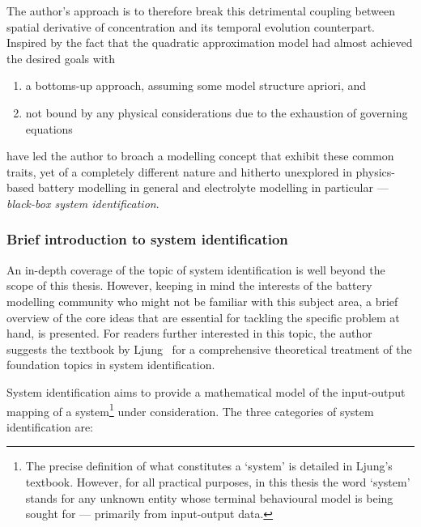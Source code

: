The author's  approach is to  therefore break this detrimental  coupling between
spatial  derivative of  concentration  and its  temporal evolution  counterpart.
Inspired by the fact that the  quadratic approximation model had almost achieved
the desired goals with
\begin{enumerate}[label=\emph{\alph*})]
    \item a bottoms-up approach, \ie{} assuming some model structure apriori, and
    \item not bound by any physical considerations due to the exhaustion of governing equations
\end{enumerate}
have led  the author  to broach  a modelling concept  that exhibit  these common
traits,  yet  of  a  completely  different nature  and  hitherto  unexplored  in
physics-based  battery  modelling  in   general  and  electrolyte  modelling  in
particular --- \emph{black-box system identification}.

\subsubsection*{Brief introduction to system identification}\label{subsubsec:introsysid}

An in-depth  coverage of the topic  of system identification is  well beyond the
scope of  this thesis.  However, keeping  in mind the  interests of  the battery
modelling community  who might not be  familiar with this subject  area, a brief
overview of the core ideas that  are essential for tackling the specific problem
at hand, is presented. For readers  further interested in this topic, the author
suggests the textbook by  Ljung~\cite{Ljung1999} for a comprehensive theoretical
treatment of the foundation topics in system identification.

System identification aims  to provide a mathematical model  of the input-output
mapping  of  a system\footnote{The  precise  definition  of what  constitutes  a
`system' is detailed  in Ljung's textbook. However, for  all practical purposes,
in this  thesis the word `system'  stands for any unknown  entity whose terminal
behavioural model  is being  sought for ---  primarily from  input-output data.}
under consideration. The three categories of system identification are:


